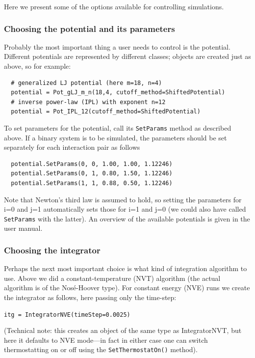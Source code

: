 Here we present some of the options available for controlling simulations.

\subsubsection{Choosing the potential and its parameters}

Probably the most important thing a user needs to control is the 
potential. Different potentials are represented by different classes; objects
are created just as above, so for example:

\begin{verbatim}
  # generalized LJ potential (here m=18, n=4)
  potential = Pot_gLJ_m_n(18,4, cutoff_method=ShiftedPotential) 
  # inverse power-law (IPL) with exponent n=12
  potential = Pot_IPL_12(cutoff_method=ShiftedPotential)
\end{verbatim}


To set parameters for the potential, call its \verb|SetParams| method as 
described above. If a binary system is to be simulated, 
the parameters should be set separately for each interaction pair as follows

\begin{verbatim}
  potential.SetParams(0, 0, 1.00, 1.00, 1.12246)
  potential.SetParams(0, 1, 0.80, 1.50, 1.12246)
  potential.SetParams(1, 1, 0.88, 0.50, 1.12246)
\end{verbatim}

Note that Newton's third law is assumed to hold, so setting the parameters for 
i=0 and j=1 automatically sets those for i=1 and j=0 (we could also have 
called \verb|SetParams| with the latter).
An overview of the available potentials is given in the user manual. 

\subsubsection{Choosing the integrator}

Perhaps the next most important choice is what kind of integration algorithm
to use. Above we did a constant-temperature (NVT) algorithm (the actual
algorithm is of the Nos{\'e}-Hoover type). For constant energy (NVE) runs we
create the integrator as follows, here passing only the time-step:

\verb|itg = IntegratorNVE(timeStep=0.0025)|

(Technical note: this creates an object of the same type as IntegratorNVT,
but here it defaults to NVE mode---in fact in either case one can switch 
thermostatting on or off using the \verb|SetThermostatOn()| method). 

